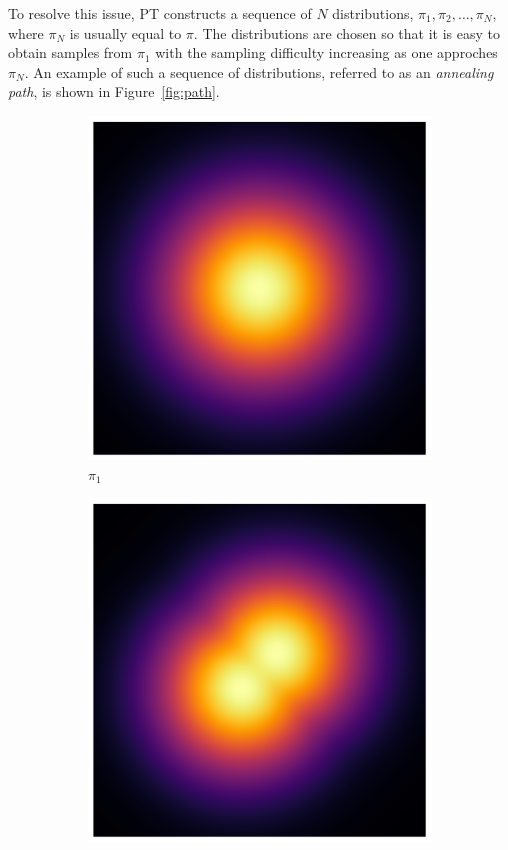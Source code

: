 To resolve this issue, PT constructs a sequence of $N$ distributions,  
$\pi_1, \pi_2, \ldots, \pi_N$, where $\pi_N$ is usually equal to $\pi$.
The distributions are chosen so that it is easy to obtain samples from $\pi_1$
with the sampling difficulty increasing as one approches $\pi_N$. An example 
of such a sequence of distributions, referred to as an \textit{annealing path},
is shown in Figure~\ref{fig:path}.

\begin{figure}[t]
    \centering
    \begin{subfigure}{0.15\textwidth}
      \centering
      \includegraphics[width=\textwidth]{img/heatmap_path_1.pdf}
      \caption*{$\pi_1$}
    \end{subfigure}
    \begin{subfigure}{0.15\textwidth}
      \centering
      \includegraphics[width=\textwidth]{img/heatmap_path_2.pdf}

\end{subfigure}
\end{figure}
